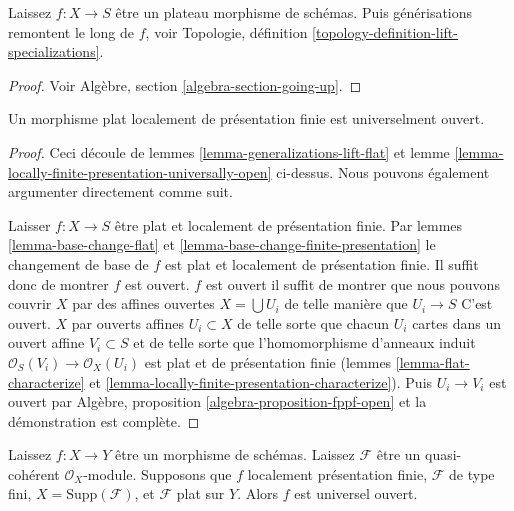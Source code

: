 \begin{lemma}

\label{lemma-generalizations-lift-flat}
Laissez $f : X \to S$ être un plateau morphisme de schémas. Puis générisations remontent le long de $f$, voir Topologie, définition \ref{topology-definition-lift-specializations}.
\end{lemma}

\begin{proof}
Voir Algèbre, section \ref{algebra-section-going-up}.
\end{proof}

\begin{lemma}

\label{lemma-fppf-open}

Un morphisme plat localement de présentation finie est universelment ouvert.

\end{lemma}

\begin{proof}
Ceci découle de lemmes \ref{lemma-generalizations-lift-flat} et lemme \ref{lemma-locally-finite-presentation-universally-open} ci-dessus. Nous pouvons également argumenter directement comme suit.

\medskip\noindent

Laisser $f : X \to S$ être plat et localement de présentation finie. Par lemmes \ref{lemma-base-change-flat} et
\ref{lemma-base-change-finite-presentation} le changement de base de $f$ est plat et localement de présentation finie. Il suffit donc de montrer $f$ est ouvert. $f$ est ouvert il suffit de montrer que nous pouvons couvrir
$X$ par des affines ouvertes $X = \bigcup U_i$ de telle manière que $U_i \to S$
C'est ouvert. $X$ par ouverts affines $U_i \subset X$ de telle sorte que chacun
$U_i$ cartes dans un ouvert affine $V_i \subset S$ et de telle sorte que l'homomorphisme d'anneaux induit $\mathcal{O}_S(V_i) \to \mathcal{O}_X(U_i)$ est plat et de présentation finie (lemmes \ref{lemma-flat-characterize} et
\ref{lemma-locally-finite-presentation-characterize}). Puis $U_i \to V_i$ est ouvert par Algèbre, proposition \ref{algebra-proposition-fppf-open}
et la démonstration est complète.

\end{proof}

\begin{lemma}

\label{lemma-pf-flat-module-open}
Laissez $f : X \to Y$ être un morphisme de schémas. Laissez $\mathcal{F}$ être un quasi-cohérent $\mathcal{O}_X$-module. Supposons que $f$ localement présentation finie, $\mathcal{F}$ de type fini, $X = \text{Supp}(\mathcal{F})$, et $\mathcal{F}$ plat sur $Y$. Alors $f$ est universel ouvert.
\end{lemma}

